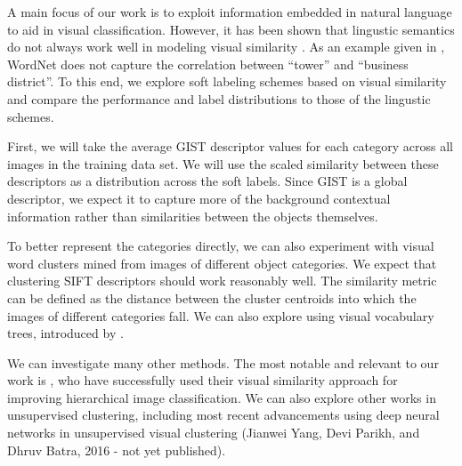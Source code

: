 A main focus of our work is to exploit information embedded in natural language
to aid in visual classification.  However, it has been shown that lingustic
semantics do not always work well in modeling visual similarity
\cite{li2010building}. As an example given in \cite{li2010building}, WordNet
does not capture the correlation between ``tower'' and ``business district''.
To this end, we explore soft labeling schemes based on visual similarity
and compare the performance and label distributions to those of the lingustic
schemes.


First, we will take the average GIST descriptor \cite{oliva2001modeling} values
for each category across all images in the training data set. We will use the
scaled similarity between these descriptors as a distribution across the soft
labels.
Since GIST is a global descriptor, we expect it to capture more of the
background contextual information rather than similarities between the objects
themselves.

To better represent the categories directly, we can also experiment with
visual word clusters mined from images of different object categories.
We expect that clustering SIFT descriptors \cite{lowe1999object} should work
reasonably well.
The similarity metric can be defined as the distance between the cluster
centroids into which the images of different categories fall.
We can also explore using visual vocabulary trees, introduced by
\cite{nister2006scalable}.

We can investigate many other methods. The most notable and relevant to our
work is \cite{li2010building}, who have successfully used their visual
similarity approach for improving hierarchical image classification.
We can also explore other works in unsupervised clustering, including most
recent advancements using deep neural networks in unsupervised visual
clustering
(Jianwei Yang, Devi Parikh, and Dhruv Batra, 2016 - not yet published).

